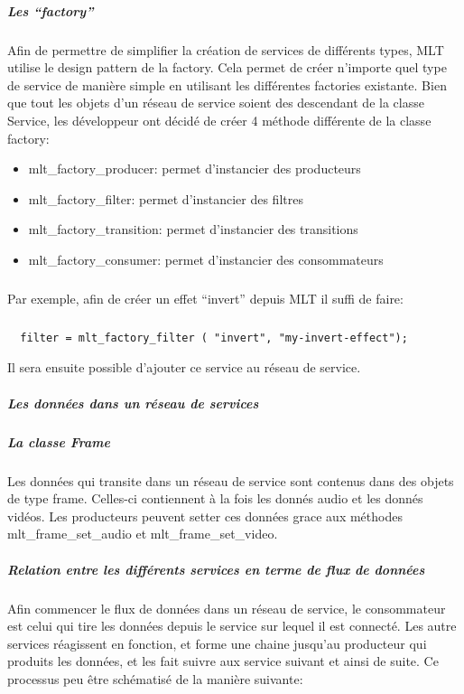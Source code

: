 \subparagraph{Les ``factory''}

Afin de permettre de simplifier la création de services de différents
types, MLT utilise le design pattern de la factory. Cela permet de
créer n'importe quel type de service de manière simple en utilisant les
différentes factories existante. Bien que tout les objets d'un réseau
de service soient des descendant de la classe Service, les développeur
ont décidé de créer 4 méthode différente de la classe factory:

\begin{itemize}

  \item {mlt\_factory\_producer: permet d'instancier des producteurs}

  \item {mlt\_factory\_filter: permet d'instancier des filtres}

  \item {mlt\_factory\_transition: permet d'instancier des transitions}

  \item {mlt\_factory\_consumer: permet d'instancier des consommateurs}

\end{itemize}

\subparagraph{}

Par exemple, afin de créer un effet ``invert'' depuis MLT il suffi
de faire:

\subparagraph{}

\begin{lstlisting}
  filter = mlt_factory_filter ( "invert", "my-invert-effect");
\end{lstlisting}

Il sera ensuite possible d'ajouter ce service au réseau de service.

\subparagraph{Les données dans un réseau de services}

\subparagraph{La classe Frame}

\subparagraph{}

Les données qui transite dans un réseau de service sont contenus dans
des objets de type frame. Celles-ci contiennent à la fois les donnés
audio et les donnés vidéos. Les producteurs peuvent setter ces données
grace aux méthodes mlt\_frame\_set\_audio et mlt\_frame\_set\_video.

\subparagraph{Relation entre les différents services en terme de flux
de données}

Afin commencer le flux de données dans un réseau de service, le
consommateur est celui qui tire les données depuis le service sur
lequel il est connecté.  Les autre services réagissent en fonction,
et forme une chaine jusqu'au producteur qui produits les données, et
les fait suivre aux service suivant et ainsi de suite. Ce processus peu
être schématisé de la manière suivante:

